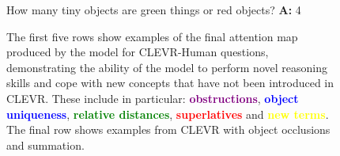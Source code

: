\documentclass[fleqn]{article}
\begin{document}
\begin{figure}[t]
\begin{minipage}{0.49\textwidth}
\scriptsize

{} How many tiny objects are green things or red objects? {\normalfont\textbf{A:}} 4 \textcolor{lime}{}
\end{minipage}

\caption{The first five rows show examples of the final attention map produced by the model for CLEVR-Human questions, demonstrating the ability of the model to perform novel reasoning skills and cope with new concepts that have not been introduced in CLEVR. These include in particular: \textcolor{purple}{\textbf{obstructions}}, \textcolor{blue}{\textbf{object uniqueness}}, \textcolor{green}{\textbf{relative distances}}, \textcolor{red}{\textbf{superlatives}} and \textcolor{yellow}{\textbf{new terms}}. The final row shows examples from CLEVR with object occlusions and summation.}
\label{fig:hexample_supp}
\label{hexample_supp}
\end{figure}
\end{document}
